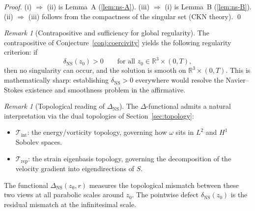 \documentclass[11pt]{article}
\theoremstyle{definition}
\theoremstyle{remark}
\newtheorem{remark}[theorem]{Remark}
\newcommand{\R}{\mathbb{R}}
\begin{document}
\begin{proof}
(i) $\Rightarrow$ (ii) is Lemma~A (\ref{lem:ns-A}).
(iii) $\Rightarrow$ (i) is Lemma~B (\ref{lem:ns-B}).
(ii) $\Rightarrow$ (iii) follows from the compactness of the singular set
(CKN theory). \qed
\end{proof}


\begin{remark}[Contrapositive and sufficiency for global regularity]
\label{rem:contrapositive}
The contrapositive of Conjecture~\ref{conj:coercivity} yields the
following regularity criterion: if
\[
\delta_{\mathrm{NS}}(z_0) > 0 \qquad \text{for all } z_0 \in \R^3 \times (0,T),
\]
then no singularity can occur, and the solution is smooth on $\R^3 \times (0,T)$.
This is mathematically sharp: establishing $\delta_{\mathrm{NS}} > 0$
everywhere would resolve the Navier--Stokes existence and smoothness
problem in the affirmative.
\end{remark}

\begin{remark}[Topological reading of $\Delta_{\mathrm{NS}}$]
\label{rem:topo-reading}
The $\Delta$-functional admits a natural interpretation via the dual
topologies of Section~\ref{sec:topology}:
\begin{itemize}[leftmargin=2em]
\item $\mathcal{T}_{\mathrm{int}}$: the energy/vorticity topology,
  governing how $\omega$ sits in $L^2$ and $H^1$ Sobolev spaces.
\item $\mathcal{T}_{\mathrm{rep}}$: the strain eigenbasis topology,
  governing the decomposition of the velocity gradient into
  eigendirections of $S$.
\end{itemize}
The functional $\Delta_{\mathrm{NS}}(z_0, r)$ measures the topological
mismatch between these two views at all parabolic scales around $z_0$.
The pointwise defect $\delta_{\mathrm{NS}}(z_0)$ is the residual mismatch
at the infinitesimal scale.
\end{remark}
\end{document}
